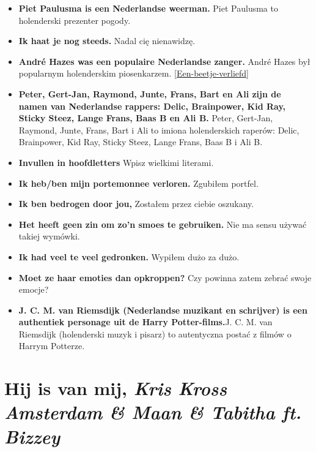 \documentclass[
]{book}
\begin{document}
\begin{itemize}
\item
  \textbf{Piet Paulusma is een Nederlandse weerman.} Piet Paulusma to holenderski prezenter pogody.\\
\item
  \textbf{Ik haat je nog steeds.} Nadal cię nienawidzę.\\
\item
  \textbf{André Hazes was een populaire Nederlandse zanger.} André Hazes był popularnym holenderskim piosenkarzem. \ref{Een-beetje-verliefd}\\
\item
  \textbf{Peter, Gert-Jan, Raymond, Junte, Frans, Bart en Ali zijn de namen van Nederlandse rappers: Delic, Brainpower, Kid Ray, Sticky Steez, Lange Frans, Baas B en Ali B.} Peter, Gert-Jan, Raymond, Junte, Frans, Bart i Ali to imiona holenderskich raperów: Delic, Brainpower, Kid Ray, Sticky Steez, Lange Frans, Baas B i Ali B.\\
\item
  \textbf{Invullen in hoofdletters} Wpisz wielkimi literami.\\
\item
  \textbf{Ik heb/ben mijn portemonnee verloren.} Zgubiłem portfel.\\
\item
  \textbf{Ik ben bedrogen door jou,} Zostałem przez ciebie oszukany.\\
\item
  \textbf{Het heeft geen zin om zo'n smoes te gebruiken.} Nie ma sensu używać takiej wymówki.\\
\item
  \textbf{Ik had veel te veel gedronken.} Wypiłem dużo za dużo.\\
\item
  \textbf{Moet ze haar emoties dan opkroppen?} Czy powinna zatem zebrać swoje emocje?\\
\item
  \textbf{J. C. M. van Riemsdijk (Nederlandse muzikant en schrijver) is een authentiek personage uit de Harry Potter-films.}J. C. M. van Riemsdijk (holenderski muzyk i pisarz) to autentyczna postać z filmów o Harrym Potterze.
\end{itemize}

\hypertarget{Hij-is-van-mij}{%
\section{\texorpdfstring{Hij is van mij, \emph{Kris Kross Amsterdam \& Maan \& Tabitha ft. Bizzey }}{Hij is van mij, Kris Kross Amsterdam \& Maan \& Tabitha ft. Bizzey }}\label{Hij-is-van-mij}}
\end{document}
